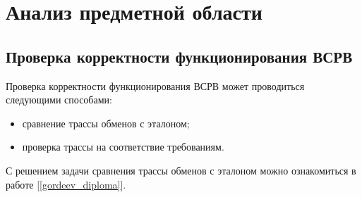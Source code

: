 \section{Анализ предметной области}

\subsection{Проверка корректности функционирования ВСРВ}

Проверка корректности функционирования ВСРВ может проводиться следующими 
способами:

\begin{itemize}
 \item сравнение трассы обменов с эталоном;
 \item проверка трассы на соответствие требованиям.
\end{itemize}

С решением задачи сравнения трассы обменов с эталоном можно ознакомиться в 
работе [\ref{gordeev_diploma}].
